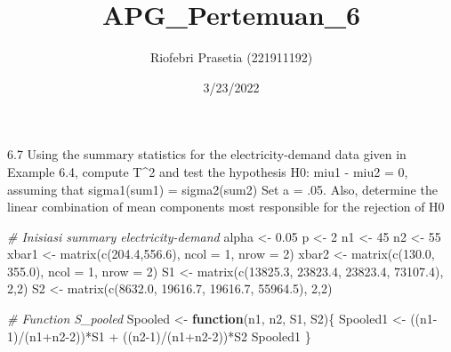 \documentclass[
]{article}
\title{APG\_Pertemuan\_6}
\author{Riofebri Prasetia (221911192)}
\date{3/23/2022}
\newenvironment{Shaded}{\begin{snugshade}}{\end{snugshade}}
\newcommand{\AttributeTok}[1]{\textcolor[rgb]{0.77,0.63,0.00}{#1}}
\newcommand{\CommentTok}[1]{\textcolor[rgb]{0.56,0.35,0.01}{\textit{#1}}}
\newcommand{\ControlFlowTok}[1]{\textcolor[rgb]{0.13,0.29,0.53}{\textbf{#1}}}
\newcommand{\DecValTok}[1]{\textcolor[rgb]{0.00,0.00,0.81}{#1}}
\newcommand{\FloatTok}[1]{\textcolor[rgb]{0.00,0.00,0.81}{#1}}
\newcommand{\FunctionTok}[1]{\textcolor[rgb]{0.00,0.00,0.00}{#1}}
\newcommand{\NormalTok}[1]{#1}
\newcommand{\OtherTok}[1]{\textcolor[rgb]{0.56,0.35,0.01}{#1}}
\newcommand{\SpecialCharTok}[1]{\textcolor[rgb]{0.00,0.00,0.00}{#1}}
\begin{document}
\maketitle

6.7 Using the summary statistics for the electricity-demand data given
in Example 6.4, compute T\^{}2 and test the hypothesis H0: miu1 - miu2 =
0, assuming that sigma1(sum1) = sigma2(sum2) Set a = .05. Also,
determine the linear combination of mean components most responsible for
the rejection of H0

\begin{Shaded}
\begin{Highlighting}[]
\CommentTok{\# Inisiasi summary electricity{-}demand}
\NormalTok{alpha }\OtherTok{\textless{}{-}} \FloatTok{0.05}
\NormalTok{p }\OtherTok{\textless{}{-}} \DecValTok{2}
\NormalTok{n1 }\OtherTok{\textless{}{-}} \DecValTok{45}
\NormalTok{n2 }\OtherTok{\textless{}{-}} \DecValTok{55}
\NormalTok{xbar1 }\OtherTok{\textless{}{-}} \FunctionTok{matrix}\NormalTok{(}\FunctionTok{c}\NormalTok{(}\FloatTok{204.4}\NormalTok{,}\FloatTok{556.6}\NormalTok{), }\AttributeTok{ncol =} \DecValTok{1}\NormalTok{, }\AttributeTok{nrow =} \DecValTok{2}\NormalTok{)}
\NormalTok{xbar2 }\OtherTok{\textless{}{-}} \FunctionTok{matrix}\NormalTok{(}\FunctionTok{c}\NormalTok{(}\FloatTok{130.0}\NormalTok{, }\FloatTok{355.0}\NormalTok{), }\AttributeTok{ncol =} \DecValTok{1}\NormalTok{, }\AttributeTok{nrow =} \DecValTok{2}\NormalTok{)}
\NormalTok{S1 }\OtherTok{\textless{}{-}} \FunctionTok{matrix}\NormalTok{(}\FunctionTok{c}\NormalTok{(}\FloatTok{13825.3}\NormalTok{, }\FloatTok{23823.4}\NormalTok{, }\FloatTok{23823.4}\NormalTok{, }\FloatTok{73107.4}\NormalTok{), }\DecValTok{2}\NormalTok{,}\DecValTok{2}\NormalTok{)}
\NormalTok{S2 }\OtherTok{\textless{}{-}} \FunctionTok{matrix}\NormalTok{(}\FunctionTok{c}\NormalTok{(}\FloatTok{8632.0}\NormalTok{, }\FloatTok{19616.7}\NormalTok{, }\FloatTok{19616.7}\NormalTok{, }\FloatTok{55964.5}\NormalTok{), }\DecValTok{2}\NormalTok{,}\DecValTok{2}\NormalTok{)}
\end{Highlighting}
\end{Shaded}

\begin{Shaded}
\begin{Highlighting}[]
\CommentTok{\# Function S\_pooled}
\NormalTok{Spooled }\OtherTok{\textless{}{-}} \ControlFlowTok{function}\NormalTok{(n1, n2, S1, S2)\{}
\NormalTok{  Spooled1 }\OtherTok{\textless{}{-}}\NormalTok{ ((n1}\DecValTok{{-}1}\NormalTok{)}\SpecialCharTok{/}\NormalTok{(n1}\SpecialCharTok{+}\NormalTok{n2}\DecValTok{{-}2}\NormalTok{))}\SpecialCharTok{*}\NormalTok{S1 }\SpecialCharTok{+}\NormalTok{ ((n2}\DecValTok{{-}1}\NormalTok{)}\SpecialCharTok{/}\NormalTok{(n1}\SpecialCharTok{+}\NormalTok{n2}\DecValTok{{-}2}\NormalTok{))}\SpecialCharTok{*}\NormalTok{S2}
\NormalTok{  Spooled1}
\NormalTok{\}}
\end{Highlighting}
\end{Shaded}
\end{document}
